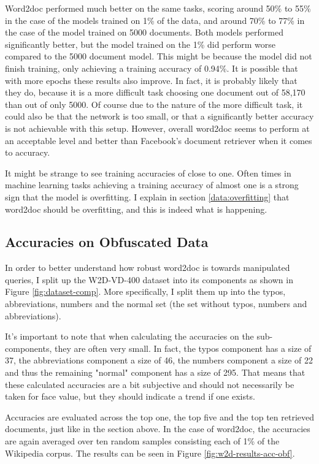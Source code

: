 Word2doc performed much better on the same tasks, scoring around 50\% to 55\% in the case of the models trained on 1\% of the
data, and around 70\% to 77\% in the case of the model trained on 5000 documents. Both models performed significantly better, but
the model trained on the 1\% did perform worse compared to the 5000 document model. This might be because the model
did not finish training, only achieving a training accuracy of 0.94\%. It is possible that with more epochs these results also
improve. In fact, it is probably likely that they do, because it is a more difficult task choosing one document out of
58,170 than out of only 5000. Of course due to the nature of the more difficult task, it could also be that the network is too
small, or that a significantly better accuracy is not achievable with this setup. However, overall word2doc seems to perform
at an acceptable level and better than Facebook's document retriever when it comes to accuracy.

It might be strange to see training accuracies of close to one. Often times in machine learning tasks achieving a training accuracy
of almost one is a strong sign that the model is overfitting. I explain in section \ref{data:overfitting} that word2doc should be
overfitting, and this is indeed what is happening.

\subsection{Accuracies on Obfuscated Data}

In order to better understand how robust word2doc is towards manipulated queries, I split up the W2D-VD-400 dataset into its
components as shown in Figure \ref{fig:dataset-comp}. More specifically, I split them up into the typos, abbreviations, numbers and
the normal set (the set without typos, numbers and abbreviations).

It's important to note that when calculating the accuracies on the sub-components, they are often very small. In fact, the typos
component has a size of 37, the abbreviations component a size of 46, the numbers component a size of 22 and thus the remaining
"normal" component has a size of 295. That means that these calculated accuracies are a bit subjective and should not necessarily
be taken for face value, but they should indicate a trend if one exists.

Accuracies are evaluated across the top one, the top five and the top ten retrieved documents, just like in the section above.
In the case of word2doc, the accuracies are again averaged over ten random samples consisting each of 1\% of the Wikipedia corpus.
The results can be seen in Figure \ref{fig:w2d-results-acc-obf}.

